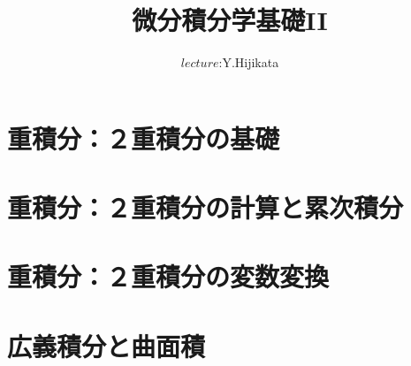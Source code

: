 \documentclass{jsarticle}
\title{微分積分学基礎I\hspace{-.1em}I}
\author{$\textit{lecture}$:Y.Hijikata}
\begin{document}
\maketitle
\tableofcontents
\clearpage
\section{重積分：２重積分の基礎}
\clearpage
\section{重積分：２重積分の計算と累次積分}
\clearpage
\section{重積分：２重積分の変数変換}
\clearpage
\section{広義積分と曲面積}
\clearpage
\end{document}
